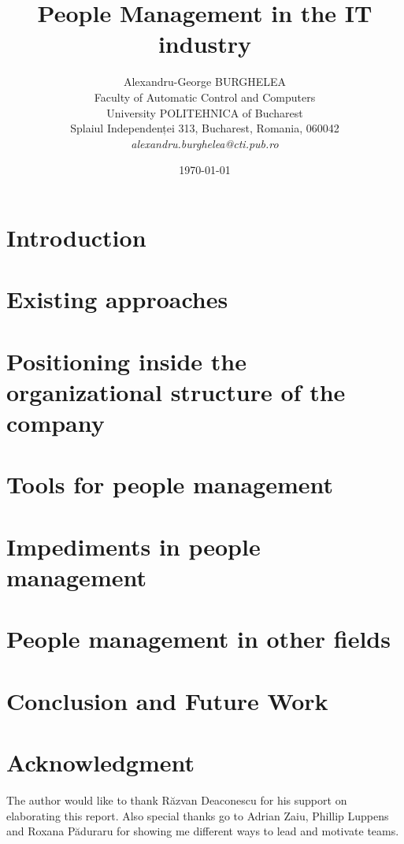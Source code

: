 \documentclass[12pt]{article}
\title{People Management in the IT industry}
\author{Alexandru-George BURGHELEA\\
Faculty of Automatic Control and Computers\\
University POLITEHNICA of Bucharest\\
Splaiul Independenței 313, Bucharest, Romania, 060042 \\
\emph{alexandru.burghelea@cti.pub.ro}}
\date{\today}
\begin{document}
\maketitle

\begin{abstract}

\end{abstract}

\section{Introduction}
\label{sec:introduction}


\section{Existing approaches}
\label{sec:existingapproaches}


\section{Positioning inside the organizational structure of the company}
\label{sec:positioning}


\section{Tools for people management}
\label{sec:tools}


\section{Impediments in people management}
\label{sec:impediments}


\section{People management in other fields}
\label{sec:otherfields}


\section{Conclusion and Future Work}
\label{sec:conclusion}


\section*{Acknowledgment}
\label{sec:acknowledgment}
The author would like to thank R\u{a}zvan Deaconescu for his support on elaborating this report. Also special thanks go to Adrian Zaiu, Phillip Luppens and Roxana P\u{a}duraru for showing me different ways to lead and motivate teams.



\end{document}
